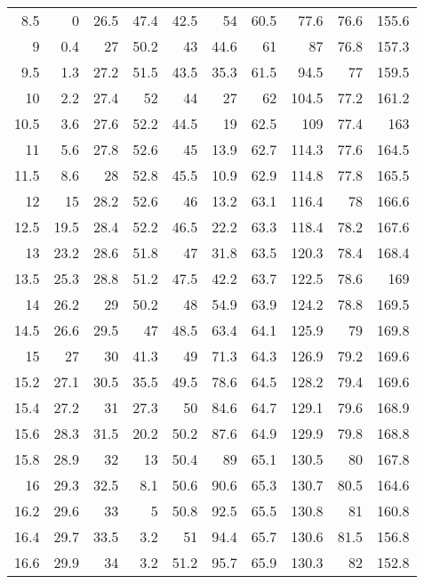 \documentclass[a4 paper,12pt]{article}
\begin{document}
\begin{footnotesize}
\begin{longtable}{||r|r||r|r||r|r||r|r||r|r||}
		8.5   & 0     & 26.5  & 47.4  & 42.5  & 54    & 60.5  & 77.6  & 76.6  & 155.6 \\
		9     & 0.4   & 27    & 50.2  & 43    & 44.6  & 61    & 87    & 76.8  & 157.3 \\
		9.5   & 1.3   & 27.2  & 51.5  & 43.5  & 35.3  & 61.5  & 94.5  & 77    & 159.5 \\
		10    & 2.2   & 27.4  & 52    & 44    & 27    & 62    & 104.5 & 77.2  & 161.2 \\
		10.5  & 3.6   & 27.6  & 52.2  & 44.5  & 19    & 62.5  & 109   & 77.4  & 163 \\
		11    & 5.6   & 27.8  & 52.6  & 45    & 13.9  & 62.7  & 114.3 & 77.6  & 164.5 \\
		11.5  & 8.6   & 28    & 52.8  & 45.5  & 10.9  & 62.9  & 114.8 & 77.8  & 165.5 \\
		12    & 15    & 28.2  & 52.6  & 46    & 13.2  & 63.1  & 116.4 & 78    & 166.6 \\
		12.5  & 19.5  & 28.4  & 52.2  & 46.5  & 22.2  & 63.3  & 118.4 & 78.2  & 167.6 \\
		13    & 23.2  & 28.6  & 51.8  & 47    & 31.8  & 63.5  & 120.3 & 78.4  & 168.4 \\
		13.5  & 25.3  & 28.8  & 51.2  & 47.5  & 42.2  & 63.7  & 122.5 & 78.6  & 169 \\
		14    & 26.2  & 29    & 50.2  & 48    & 54.9  & 63.9  & 124.2 & 78.8  & 169.5 \\
		14.5  & 26.6  & 29.5  & 47    & 48.5  & 63.4  & 64.1  & 125.9 & 79    & 169.8 \\
		15    & 27    & 30    & 41.3  & 49    & 71.3  & 64.3  & 126.9 & 79.2  & 169.6 \\
		15.2  & 27.1  & 30.5  & 35.5  & 49.5  & 78.6  & 64.5  & 128.2 & 79.4  & 169.6 \\
		15.4  & 27.2  & 31    & 27.3  & 50    & 84.6  & 64.7  & 129.1 & 79.6  & 168.9 \\
		15.6  & 28.3  & 31.5  & 20.2  & 50.2  & 87.6  & 64.9  & 129.9 & 79.8  & 168.8 \\
		\hline
		\hline
		15.8  & 28.9  & 32    & 13    & 50.4  & 89    & 65.1  & 130.5 & 80    & 167.8 \\
		16    & 29.3  & 32.5  & 8.1   & 50.6  & 90.6  & 65.3  & 130.7 & 80.5  & 164.6 \\
		16.2  & 29.6  & 33    & 5     & 50.8  & 92.5  & 65.5  & 130.8 & 81    & 160.8 \\
		16.4  & 29.7  & 33.5  & 3.2   & 51    & 94.4  & 65.7  & 130.6 & 81.5  & 156.8 \\
		16.6  & 29.9  & 34    & 3.2   & 51.2  & 95.7  & 65.9  & 130.3 & 82    & 152.8 \\

\end{longtable}
\end{footnotesize}
\end{document}
